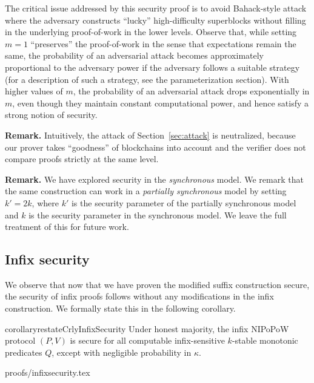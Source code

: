 
\begin{remark}
\label{rmk.variance}
The critical issue addressed by this security proof is to avoid Bahack-style
attack \cite{bahack} where the adversary constructs ``lucky'' high-difficulty
superblocks without filling in the underlying proof-of-work in the lower
levels. Observe that, while setting $m = 1$ ``preserves'' the proof-of-work in
the sense that expectations remain the same, the probability of an adversarial
attack becomes approximately proportional to the adversary power if the
adversary follows a suitable strategy (for a description of such a strategy,
see the parameterization section). With higher values of $m$, the probability of
an adversarial attack drops exponentially in $m$, even though they maintain constant
computational power, and hence satisfy a strong notion of security.
\end{remark}

\noindent\textbf{Remark.}
Intuitively, the attack of Section~\ref{sec:attack} is neutralized, because
our prover takes ``goodness'' of blockchains into account and the verifier
does not compare proofs strictly at the same level.

\noindent\textbf{Remark.}
We have explored security in the \emph{synchronous} model. We remark that the
same construction can work in a \emph{partially synchronous} model by setting
$k' = 2k$, where $k'$ is the security parameter of the partially synchronous
model and $k$ is the security parameter in the synchronous model. We leave the
full treatment of this for future work.

\subsection{Infix security}
We observe that now that we have proven the modified suffix construction secure,
the security of infix proofs follows without any modifications in the infix
construction. We formally state this in the following corollary.

\begin{restatable}{corollary}{restateCrlyInfixSecurity}
\label{crly.infix-security}
Under honest majority, the infix NIPoPoW protocol $(P, V)$ is secure for all
computable infix-sensitive $k$-stable monotonic predicates $Q$, except with
negligible probability in $\kappa$.
\end{restatable}
{proofs/infixsecurity.tex}
